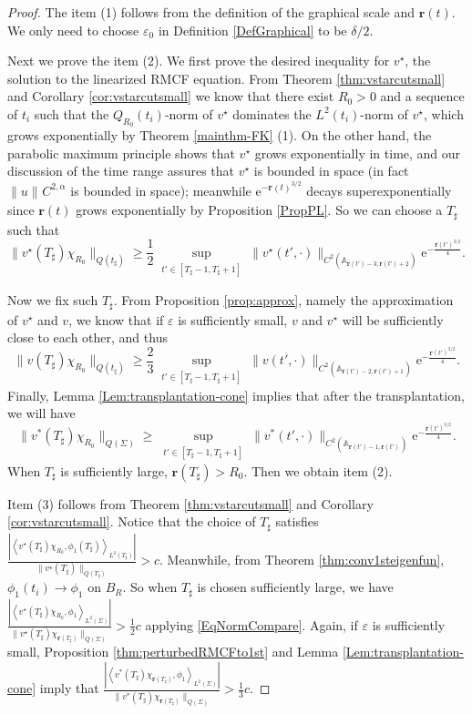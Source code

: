 \documentclass[12pt]{amsart}
\numberwithin{equation}{section}
\numberwithin{equation}{section}
\newcommand{\eps}{\varepsilon}
\newcommand{\dt}{\delta}
\newcommand{\br}{\mathbf{r}}
\begin{document}
	\begin{proof}
		The item (1) follows from the definition of the graphical scale and $\mathbf{r}(t)$. We only need to choose $\eps_0$ in Definition \ref{DefGraphical} to be $\dt/2$. 
		
		Next we prove the item (2). We first prove the desired inequality for $v^\star$, the solution to the linearized RMCF equation. From Theorem \ref{thm:vstarcutsmall} and Corollary \ref{cor:vstarcutsmall} we know that there exist $R_0>0$ and a sequence of $t_i$ such that the $Q_{R_0}({t_i})$-norm of $v^\star$ dominates the $L^2({t_i})$-norm of $v^\star$, which grows exponentially by Theorem \ref{mainthm-FK} (1). On the other hand, the parabolic maximum principle shows that $v^\star$ grows exponentially in time, and our discussion of the time range assures that $v^\star$ is bounded in space (in fact $\|u\|_{}C^{2,\alpha}$ is bounded in space); meanwhile $\mathrm{e}^{-{\mathbf r({t})^{3/2}}}$ decays superexponentially since $\mathbf r({t})$ grows exponentially by Proposition \ref{PropPL}. So we can choose a $T_\sharp$ such that
		$$\|v^\star(T_\sharp)\chi_{R_0}\|_{Q(t_\sharp)}\geq  
		\frac12 \sup_{\substack{ t'\in[T_{\sharp}-1,T_{\sharp}+1] }} \|v^\star(t',\cdot)\|_{C^2(\mathbb A_{\mathbf r({t'})-3,\mathbf r({t'})+2})}
		\mathrm{e}^{-\frac{{\mathbf r({t'})^{3/2}}}{4}}.$$
		
		Now we fix such $T_\sharp$. From Proposition \ref{prop:approx}, namely the approximation of $v^\star$ and $v$, we know that if $\eps$ is sufficiently small, $v$ and $v^\star$ will be sufficiently close to each other, and thus
		$$\|v(T_\sharp)\chi_{R_0}\|_{Q(t_\sharp)}\geq  
		\frac23 \sup_{\substack{ t'\in[T_{\sharp}-1,T_{\sharp}+1]}}
		\|v(t',\cdot)\|_{C^2(\mathbb A_{\mathbf r({t'})-2,\mathbf r({t'})+1})}\mathrm{e}^{-\frac{{\mathbf r({t'})^{3/2}}}{4}}.$$
		Finally, Lemma \ref{Lem:transplantation-cone} implies that after the transplantation, we will have 
		$$\|v^*(T_\sharp)\chi_{R_0}\|_{Q(\Sigma)}\geq  
		\sup_{\substack{ t'\in[T_{\sharp}-1,T_{\sharp}+1]}}
		\|v^*(t',\cdot)\|_{C^2(\mathbb A_{\mathbf r({t'})-1,\mathbf r({t'})})}\mathrm{e}^{-\frac{{\mathbf r({t'})^{3/2}}}{4}}.$$
		When $T_\sharp$ is sufficiently large, $\br({T_\sharp})>R_0$. Then we obtain item (2). 
		
		
		
		Item (3) follows from Theorem \ref{thm:vstarcutsmall} and Corollary \ref{cor:vstarcutsmall}. Notice that the choice of $T_\sharp$ satisfies $\frac{\left|\left\langle v^\star(T_\sharp)\chi_{R_0},\phi_1(T_\sharp)\right\rangle_{L^2({T_\sharp})}\right|}{\|v^\star(T_\sharp)\|_{Q({T_{\sharp}})}}>c$. Meanwhile, from Theorem \ref{thm:conv1steigenfun}, $\phi_1(t_i)\to\phi_1$ on $B_R$. So when $T_\sharp$ is chosen sufficiently large, we have $\frac{\left|\left\langle v^\star(T_\sharp)\chi_{R_0},\phi_1\right\rangle_{L^2(\Sigma)}\right|}{\|v^\star(T_\sharp)\chi_{\br(T_\sharp)}\|_{Q(\Sigma)}}>\frac{1}{2}c$ applying \eqref{EqNormCompare}. Again, if $\eps$ is sufficiently small, Proposition \ref{thm:perturbedRMCFto1st} and Lemma \ref{Lem:transplantation-cone} imply that $\frac{\left|\left\langle v^*(T_\sharp)\chi_{\br(T_\sharp)},\phi_1\right\rangle_{L^2(\Sigma)}\right|}{\|v^*(T_\sharp)\chi_{\br(T_\sharp)}\|_{Q(\Sigma)}}>\frac{1}{3}c$.
		

\end{proof}
\end{document}

